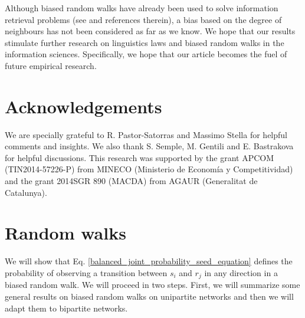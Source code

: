 \documentclass{article}
\begin{document}
Although biased random walks have already been used to solve information retrieval problems (see  and references therein), a bias based on the degree of neighbours has not been considered as far as we know. We hope that our results stimulate further research on linguistics laws and biased random walks in the information sciences. Specifically, we hope that our article becomes the fuel of future empirical research. 

\section*{Acknowledgements}
We are specially grateful to R. Pastor-Satorras and Massimo Stella for helpful comments and insights. We also thank S. Semple, M. Gentili and E. Bastrakova for helpful discussions. This research was supported by %
the grant APCOM (TIN2014-57226-P) from MINECO (Ministerio de Econom{\'i}a y Competitividad) and the grant 2014SGR 890 (MACDA) from AGAUR (Generalitat de Catalunya).

\appendix

\section{Random walks}

\label{random_walks_appendix}

We will show that Eq. \ref{balanced_joint_probability_seed_equation} defines the probability of observing a transition between $s_i$ and $r_j$ in any direction in a biased random walk. We will proceed in two steps. First, we will summarize some general results on biased random walks on unipartite networks and then we will adapt them to bipartite networks.
  
\end{document}
